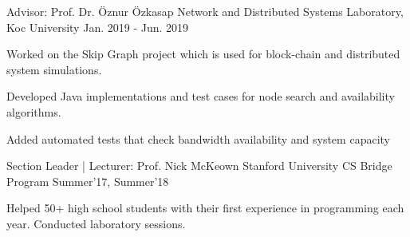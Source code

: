 
\begin{cventries}
  \cvopenentry
    {Advisor: Prof. Dr. Öznur Özkasap} %
    {Network and Distributed Systems Laboratory, Koc University} %
    {}
    {Jan. 2019 - Jun. 2019} %
    {
      \begin{cvitems} %
        \item {Worked on the Skip Graph project which is used for block-chain and distributed system simulations.}
        \item {Developed Java implementations and test cases for node search and availability algorithms.}
        \item {Added automated tests that check bandwidth availability and system capacity}
      \end{cvitems}
    }

  \cvopenentry
    {Section Leader | Lecturer: Prof. Nick McKeown } %
    {Stanford University CS Bridge Program} %
    {}
    {Summer'17, Summer'18} %
    {
      \begin{cvitems} %
        \item {Helped 50+ high school students with their first experience in programming each year. Conducted laboratory sessions.}
      \end{cvitems}
    }


\end{cventries}
